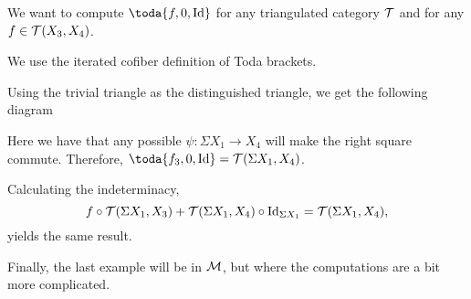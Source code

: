 \begin{example}
	We want to compute \( \toda{f, 0, \Id} \) for any triangulated category \( {\mathcal{T}} \) and for any \( f \in {\mathcal{T}}(X_3, X_4) \).

	We use the iterated cofiber definition of Toda brackets.

	Using the trivial triangle as the distinguished triangle, we get the following diagram
	\begin{center}
	\end{center}

	Here we have that any possible \( \psi: \Sigma X_1 \to X_4 \) will make the right square commute. Therefore, \( \toda{f_3, 0, \Id} = \Tc(\Sigma X_1, X_4) \).

	Calculating the indeterminacy,
	\[
		f \circ {\mathcal{T}}(\Sigma X_1, X_3) + {\mathcal{T}}(\Sigma X_1, X_4) \circ \operatorname{Id}_{\Sigma X_1} = {\mathcal{T}}(\Sigma X_1, X_4),
	\]
	yields the same result.
\end{example}

Finally, the last example will be in \( {\mathcal{M}} \), but where the computations are a bit more complicated.

